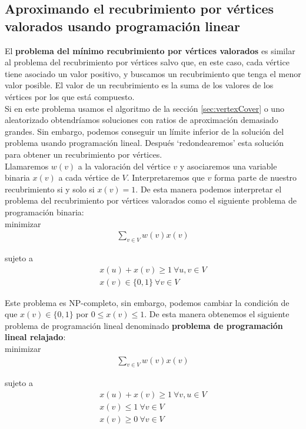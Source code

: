 \documentclass{article}
\begin{document}
\subsection{Aproximando el recubrimiento por vértices valorados usando programación linear}
El \textbf{problema del mínimo recubrimiento por vértices valorados} es similar al problema del recubrimiento por vértices salvo que, en este caso, cada vértice tiene asociado un valor positivo, y buscamos un recubrimiento que tenga el menor valor posible. El valor de un recubrimiento es la suma de los valores de los vértices por los que está compuesto.\\

Si en este problema usamos el algoritmo de la sección \ref{sec:vertexCover} o uno aleatorizado obtendríamos soluciones con ratios de aproximación demasiado grandes. Sin embargo, podemos conseguir un límite inferior de la solución del problema usando programación lineal. Después `redondearemos' esta solución para obtener un recubrimiento por vértices.\\

Llamaremos $w(v)$ a la valoración del vértice $v$ y asociaremos una variable binaria $x(v)$ a cada vértice de $V$. Interpretaremos que $v$ forma parte de nuestro recubrimiento si y solo si $x(v) = 1$.  De esta manera podemos interpretar el problema del recubrimiento por vértices valorados como el siguiente problema de programación binaria:\\

minimizar	\begin{gather*}
\sum_{v \in V}w(v)x(v)
\end {gather*}
	
sujeto a
\begin{gather*}
	x(u) + x(v) \geq 1 \ \forall u, v \in V \\
	        x(v) \in \{0,1\} \ \forall v \in V
\end{gather*}
		
	

Este problema es NP-completo, sin embargo, podemos cambiar la condición de que $x(v) \in \{0,1\}$ por $0 \leq x(v) \leq 1$. De esta manera obtenemos el siguiente problema de programación lineal denominado \textbf{problema de programación lineal relajado}:\\

minimizar
\begin{gather*}
\sum_{v \in V}w(v)x(v)
\end{gather*}
	
sujeto a
\begin{gather*}
	x(u) + x(v) \geq 1 \ \forall v, u \in V \\
	        x(v) \leq 1 \  \forall v \in V \\
					x(v) \geq 0 \ \forall v \in V
\end{gather*}
		
\end{document}
